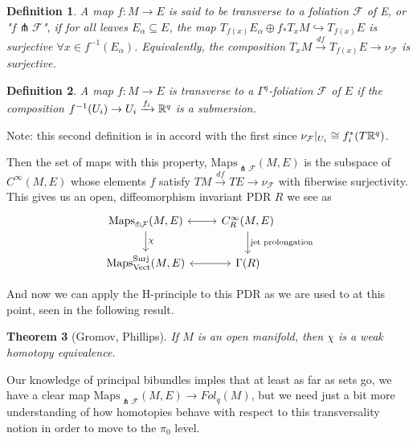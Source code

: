 \documentclass{article}
\newtheorem{theorem}{Theorem}[section]
\newtheorem{definition}[theorem]{Definition}
\newtheorem{proposed work}[theorem]{Proposed Work}
\theoremstyle{definition}
\begin{document}
\begin{definition}
A map $f:M \rightarrow E$ is said to be transverse to a foliation $\mathcal{F}$ of E, or "$f \pitchfork \mathcal{F}$", if for all leaves $E_\alpha \subseteq E$, the map $T_{f(x)}E_\alpha \oplus f_*T_xM \hookrightarrow T_{f(x)}E$ is surjective $\forall x \in f^{-1}(E_\alpha)$. Equivalently, the composition $T_xM \xrightarrow{df} T_{f(x)}E \rightarrow \nu_\mathcal{F}$ is surjective.
\end{definition}

\begin{definition}
A map $f:M \rightarrow E$ is transverse to a $\Gamma^q$-foliation $\mathcal{F}$ of $E$ if the composition $f^{-1}(U_i) \rightarrow U_i \xrightarrow{f_i} \mathbb R^q$ is a submersion.
\end{definition}
Note: this second definition is in accord with the first since $\nu_\mathcal{F}|_{U_i} \cong f_i^*(T\mathbb R^q)$.
\newline

Then the set of maps with this property, $\mathrm{Maps}_{\pitchfork\mathcal{F}}(M,E)$ is the subspace of $C^\infty(M,E)$ whose elements $f$ satisfy $TM \xrightarrow{df} TE \rightarrow \nu_\mathcal{F}$ with fiberwise surjectivity. This gives us an open, diffeomorphism invariant PDR $R$ we see as
\[  \begin{tikzcd}
    \mathrm{Maps}_{\pitchfork\mathcal{F}}(M,E) \ar[r, leftrightarrow]
    \ar[d,"\chi" hookrightarrow]
 &
    C^\infty_R(M,E)
    \ar[d, "\text{jet prolongation}"] \\
    \mathrm{Maps}^{\mathrm{Surj}}_{\mathrm{Vect}}(M,E) \ar[r, leftrightarrow] &
    \Gamma(R)
  \end{tikzcd}
\]

And now we can apply the H-principle to this PDR as we are used to at this point, seen in the following result.
\begin{theorem}[Gromov, Phillips]
If $M$ is an open manifold, then $\chi$ is a weak homotopy equivalence.
\end{theorem}

Our knowledge of principal bibundles imples that at least as far as sets go, we have a clear map $\mathrm{Maps}_{\pitchfork\mathcal{F}}(M,E)\rightarrow \mathit{Fol}_q(M)$, but we need just a bit more understanding of how homotopies behave with respect to this transversality notion in order to move to the $\pi_0$ level.
\end{document}
